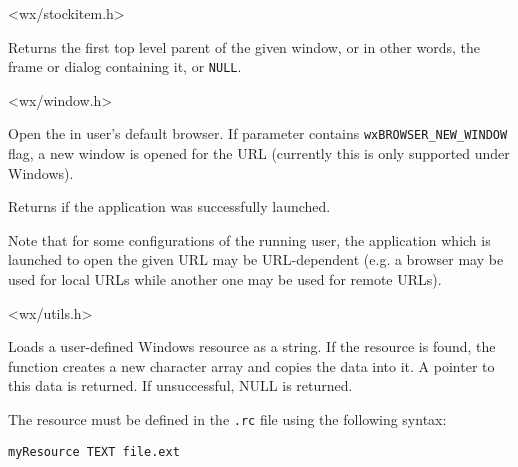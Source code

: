 

<wx/stockitem.h>


\label{wxgettoplevelparent}


Returns the first top level parent of the given window, or in other words, the
frame or dialog containing it, or {\tt NULL}.


<wx/window.h>


\label{wxlaunchdefaultbrowser}


Open the  in user's default browser. If  parameter contains
\texttt{wxBROWSER\_NEW\_WINDOW} flag, a new window is opened for the URL
(currently this is only supported under Windows).

Returns \true if the application was successfully launched.

Note that for some configurations of the running user, the application which
is launched to open the given URL may be URL-dependent (e.g. a browser may be used for
local URLs while another one may be used for remote URLs).


<wx/utils.h>


\label{wxloaduserresource}


Loads a user-defined Windows resource as a string. If the resource is found, the function creates
a new character array and copies the data into it. A pointer to this data is returned. If unsuccessful, NULL is returned.

The resource must be defined in the {\tt .rc} file using the following syntax:

\begin{verbatim}
myResource TEXT file.ext
\end{verbatim}

